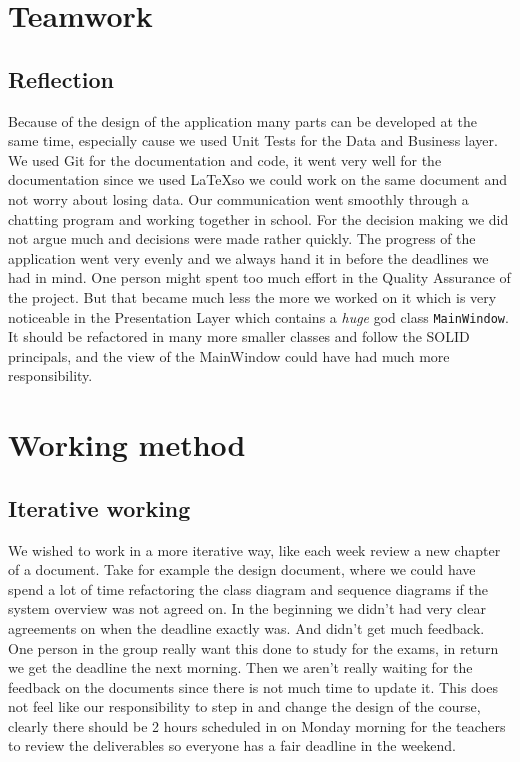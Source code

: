 \chapter{Teamwork}
\section{Reflection}
Because of the design of the application many parts can be developed at the same time, especially cause we used Unit Tests for the Data and Business layer. We used Git for the documentation and code, it went very well for the documentation since we used \LaTeX so we could work on the same document and not worry about losing data. Our communication went smoothly through a chatting program and working together in school. For the decision making we did not argue much and decisions were made rather quickly. The progress of the application went very evenly and we always hand it in before the deadlines we had in mind. One person might spent too much effort in the Quality Assurance of the project. But that became much less the more we worked on it which is very noticeable in the Presentation Layer which contains a \emph{huge} god class \texttt{MainWindow}. It should be refactored in many more smaller classes and follow the SOLID principals, and the view of the MainWindow could have had much more responsibility.

\chapter{Working method}
\section{Iterative working}
We wished to work in a more iterative way, like each week review a new chapter of a document. Take for example the design document, where we could have spend a lot of time refactoring the class diagram and sequence diagrams if the system overview was not agreed on. In the beginning we didn't had very clear agreements on when the deadline exactly was. And didn't get much feedback. One person in the group really want this done to study for the exams, in return we get the deadline the next morning. Then we aren't really waiting for the feedback on the documents since there is not much time to update it. This does not feel like our responsibility to step in and change the design of the course, clearly there should be 2 hours scheduled in on Monday morning for the teachers to review the deliverables so everyone has a fair deadline in the weekend.

